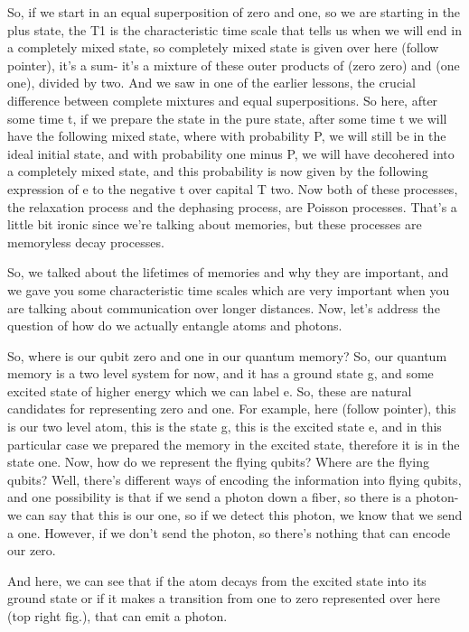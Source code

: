 So, if we start in an equal superposition of zero and one, so we are starting in the plus state, the T1 is the characteristic time scale that tells us when we will end in a completely mixed state, so completely mixed state is given over here (follow pointer), it's a sum- it's a mixture of these outer products of (zero zero) and (one one), divided by two. And we saw in one of the earlier lessons, the crucial difference between complete mixtures and equal superpositions. So here, after some time t, if we prepare the state in the pure state, after some time t we will have the following mixed state, where with probability P, we will still be in the ideal initial state, and with probability one minus P, we will have decohered into a completely mixed state, and this probability is now given by the following expression of e to the negative t over capital T two. Now both of these processes, the relaxation process and the dephasing process, are Poisson processes. That's a little bit ironic since we're talking about memories, but these processes are memoryless decay processes.

So, we talked about the lifetimes of memories and why they are important, and we gave you some characteristic time scales which are very important when you are talking about communication over longer distances. Now, let's address the question of how do we actually entangle atoms and photons.

So, where is our qubit zero and one in our quantum memory? So, our quantum memory is a two level system for now, and it has a ground state g, and some excited state of higher energy which we can label e. So, these are natural candidates for representing zero and one. For example, here (follow pointer), this is our two level atom, this is the state g, this is the excited state e, and in this particular case we prepared the memory in the excited state, therefore it is in the state one. Now, how do we represent the flying qubits? Where are the flying qubits? Well, there's different ways of encoding the information into flying qubits, and one possibility is that if we send a photon down a fiber, so there is a photon- we can say that this is our one, so if we detect this photon, we know that we send a one. However, if we don't send the photon, so there's nothing that can encode our zero.

And here, we can see that if the atom decays from the excited state into its ground state or if it makes a transition from one to zero represented over here (top right fig.), that can emit a photon.

